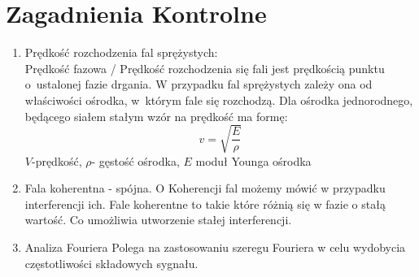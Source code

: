 \section{Zagadnienia Kontrolne}
\begin{enumerate}
    \addtocounter{enumi}{1}%
    \addtocounter{enumi}{1}%
\item Prędkość rozchodzenia fal sprężystych:\\
Prędkość fazowa / Prędkość rozchodzenia się fali jest prędkością punktu o~ustalonej fazie drgania. W przypadku fal sprężystych zależy ona od właściwości ośrodka, w~którym fale się rozchodzą. Dla ośrodka jednorodnego, będącego siałem stałym wzór na prędkość ma formę:
\[ v = \sqrt{\frac{E}{\rho}}\]
$V$-prędkość, $\rho$- gęstość ośrodka, $E$ moduł Younga ośrodka
    \addtocounter{enumi}{1}%
    \addtocounter{enumi}{1}%
\item Fala koherentna - spójna.
O Koherencji fal możemy mówić w przypadku interferencji ich. Fale koherentne to takie które różnią się w fazie o stałą wartość. Co umożliwia utworzenie stałej interferencji.
\item Analiza Fouriera
Polega na zastosowaniu szeregu Fouriera w celu wydobycia częstotliwości składowych sygnału.
    \addtocounter{enumi}{1}%

\end{enumerate}